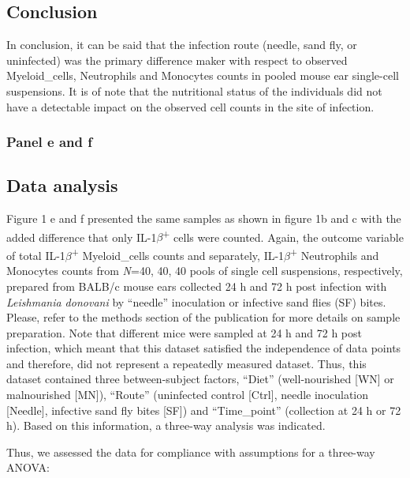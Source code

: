\documentclass[
  12pt,
  letterpaper,
]{article}
\begin{document}
\endgroup

\subsection{Conclusion}\label{conclusion}

In conclusion, it can be said that the infection route (needle, sand fly, or uninfected) was the primary difference maker with respect to observed Myeloid\_cells, Neutrophils and Monocytes counts in pooled mouse ear single-cell suspensions. It is of note that the nutritional status of the individuals did not have a detectable impact on the observed cell counts in the site of infection.

\subsubsection{Panel e and f}\label{panel-e-and-f}

\subsection{Data analysis}\label{data-analysis-1}

Figure 1 e and f presented the same samples as shown in figure 1b and c with the added difference that only IL-1\(\beta\)\textsuperscript{+} cells were counted. Again, the outcome variable of total IL-1\(\beta\)\textsuperscript{+} Myeloid\_cells counts and separately, IL-1\(\beta\)\textsuperscript{+} Neutrophils and Monocytes counts from \emph{N}=40, 40, 40 pools of single cell suspensions, respectively, prepared from BALB/c mouse ears collected 24 h and 72 h post infection with \emph{Leishmania donovani} by ``needle'' inoculation or infective sand flies (SF) bites. Please, refer to the methods section of the publication for more details on sample preparation. Note that different mice were sampled at 24 h and 72 h post infection, which meant that this dataset satisfied the independence of data points and therefore, did not represent a repeatedly measured dataset. Thus, this dataset contained three between-subject factors, ``Diet'' (well-nourished {[}WN{]} or malnourished {[}MN{]}), ``Route'' (uninfected control {[}Ctrl{]}, needle inoculation {[}Needle{]}, infective sand fly bites {[}SF{]}) and ``Time\_point'' (collection at 24 h or 72 h). Based on this information, a three-way analysis was indicated.

Thus, we assessed the data for compliance with assumptions for a three-way ANOVA:
\end{document}
